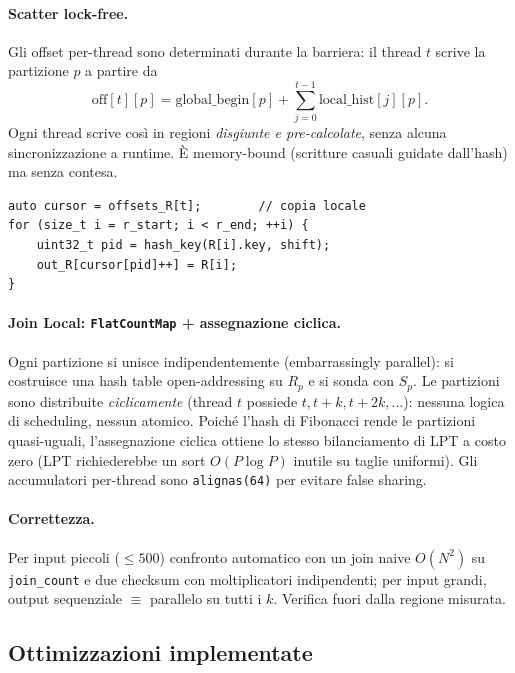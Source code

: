 \documentclass[11pt,a4paper]{article}
\theoremstyle{remark}
\begin{document}
\paragraph{Scatter lock-free.} Gli offset per-thread sono determinati durante la barriera: il thread $t$ scrive la partizione $p$ a partire da
\[
  \text{off}[t][p]=\text{global\_begin}[p]+\sum_{j=0}^{t-1}\text{local\_hist}[j][p].
\]
Ogni thread scrive cos\`i in regioni \emph{disgiunte e pre-calcolate}, senza alcuna sincronizzazione a runtime. \`E memory-bound (scritture casuali guidate dall'hash) ma senza contesa.

\begin{lstlisting}[style=cpp, caption={Scatter lock-free: cursore locale sullo stack.}]
auto cursor = offsets_R[t];        // copia locale
for (size_t i = r_start; i < r_end; ++i) {
    uint32_t pid = hash_key(R[i].key, shift);
    out_R[cursor[pid]++] = R[i];
}
\end{lstlisting}

\paragraph{Join Local: \texttt{FlatCountMap} + assegnazione ciclica.} Ogni partizione si unisce indipendentemente (embarrassingly parallel): si costruisce una hash table open-addressing su $R_p$ e si sonda con $S_p$. Le partizioni sono distribuite \emph{ciclicamente} (thread $t$ possiede $t, t{+}k, t{+}2k,\dots$): nessuna logica di scheduling, nessun atomico. Poich\'e l'hash di Fibonacci rende le partizioni quasi-uguali, l'assegnazione ciclica ottiene lo stesso bilanciamento di LPT a costo zero (LPT richiederebbe un sort $O(P\log P)$ inutile su taglie uniformi). Gli accumulatori per-thread sono \texttt{alignas(64)} per evitare false sharing.

\paragraph{Correttezza.} Per input piccoli ($\le 500$) confronto automatico con un join naive $O(N^2)$ su \texttt{join\_count} e due checksum con moltiplicatori indipendenti; per input grandi, output sequenziale $\equiv$ parallelo su tutti i $k$. Verifica fuori dalla regione misurata.

\subsection{Ottimizzazioni implementate}
\end{document}

